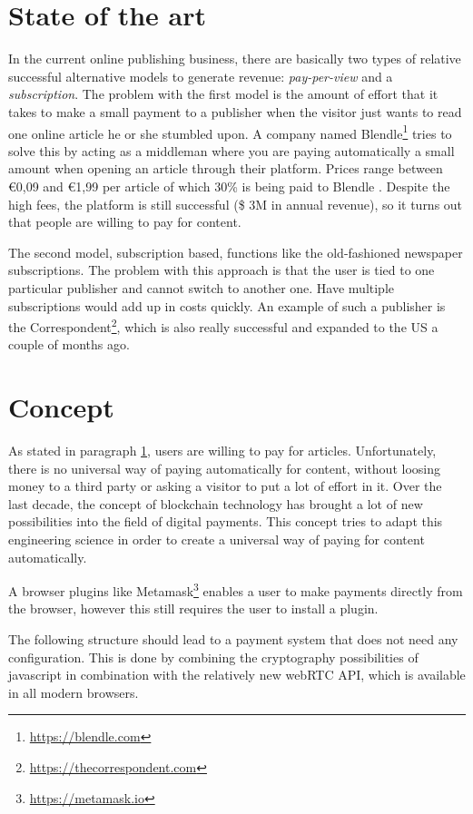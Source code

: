 \documentclass[a4paper]{article}
\begin{document}
\section{State of the art}
\label{stateoftheart}
In the current online publishing business, there are basically two types of relative successful alternative models to generate revenue: \textit{pay-per-view }and a \textit{subscription}. The problem with the first model is the amount of effort that it takes to make a small payment to a publisher when the visitor just wants to read one online article he or she stumbled upon. A company named Blendle\footnote{\url{https://blendle.com}} tries to solve this by acting as a middleman where you are paying automatically a small amount when opening an article through their platform. Prices range between €0,09 and €1,99 per article of which 30\% is being paid to Blendle . Despite the high fees, the platform is still successful (\$ 3M in annual revenue), so it turns out that people are willing to pay for content.

The second model, subscription based, functions like the old-fashioned newspaper subscriptions. The problem with this approach is that the user is tied to one particular publisher and cannot switch to another one. Have multiple subscriptions would add up in costs quickly. An example of such a publisher is the Correspondent\footnote{\url{https://thecorrespondent.com}}, which is also really successful and expanded to the US a couple of months ago.

\section {Concept}
As stated in paragraph \ref{stateoftheart}, users are willing to pay for articles. Unfortunately, there is no universal way of paying automatically for content, without loosing money to a third party or asking a visitor to put a lot of effort in it. Over the last decade, the concept of blockchain technology has brought a lot of new possibilities into the field of digital payments. This concept tries to adapt this engineering science in order to create a universal way of paying for content automatically.

A browser plugins like Metamask\footnote{\url{https://metamask.io}} enables a user to make payments directly from the browser, however this still requires the user to install a plugin.

The following structure should lead to a payment system that does not need any configuration. This is done by combining the cryptography possibilities of javascript in combination with the relatively new webRTC API, which is available in all modern browsers.
\end{document}
